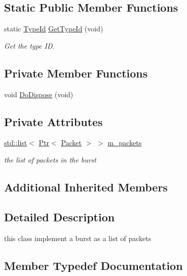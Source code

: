 \subsection*{Static Public Member Functions}
\begin{DoxyCompactItemize}
\item 
static \hyperlink{classns3_1_1TypeId}{Type\+Id} \hyperlink{classns3_1_1PacketBurst_a884ddeeae05dde5d77a4bd9031c2d303}{Get\+Type\+Id} (void)
\begin{DoxyCompactList}\small\item\em Get the type ID. \end{DoxyCompactList}\end{DoxyCompactItemize}
\subsection*{Private Member Functions}
\begin{DoxyCompactItemize}
\item 
void \hyperlink{classns3_1_1PacketBurst_a545ae45a46beed54d28ffe141fb172aa}{Do\+Dispose} (void)
\end{DoxyCompactItemize}
\subsection*{Private Attributes}
\begin{DoxyCompactItemize}
\item 
\hyperlink{openflow-interface_8h_afd9bcfa176617760671b67580f536fa7}{std\+::list}$<$ \hyperlink{classns3_1_1Ptr}{Ptr}$<$ \hyperlink{classns3_1_1Packet}{Packet} $>$ $>$ \hyperlink{classns3_1_1PacketBurst_a3c2aeb2fb721d9da2d855eab1baed309}{m\+\_\+packets}
\begin{DoxyCompactList}\small\item\em the list of packets in the burst \end{DoxyCompactList}\end{DoxyCompactItemize}
\subsection*{Additional Inherited Members}


\subsection{Detailed Description}
this class implement a burst as a list of packets 

\subsection{Member Typedef Documentation}
